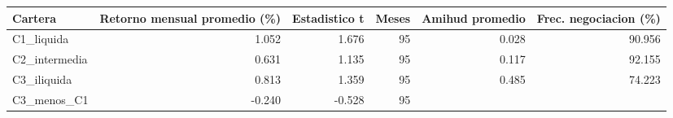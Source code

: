 \begin{tabular}{lrrrrr}
\toprule
Cartera & Retorno mensual promedio (\%) & Estadistico t & Meses & Amihud promedio & Frec. negociacion (\%) \\
\midrule
C1\_liquida & 1.052 & 1.676 & 95 & 0.028 & 90.956 \\
C2\_intermedia & 0.631 & 1.135 & 95 & 0.117 & 92.155 \\
C3\_iliquida & 0.813 & 1.359 & 95 & 0.485 & 74.223 \\
C3\_menos\_C1 & -0.240 & -0.528 & 95 &  &  \\
\bottomrule
\end{tabular}